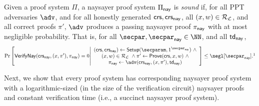 \begin{definition} Given a proof system $\Pi$, a naysayer proof system $\Pi_{\mathsf{nay}}$ is \emph{sound} if, for all PPT adversaries $\adv$, and for all honestly generated $\mathsf{crs}, \mathsf{crs}_{\mathsf{nay}}$, all $(x,w) \in \mathcal{R}_{\mathcal{L}}$, and all correct proofs $\pi'$, $\adv$ produces a passing naysayer proof $\pi_{\mathsf{nay}}$ with at most negligible probability. That is, for all $\secpar, \naysecpar \in \NN$, and all $\mathsf{td}_{\mathsf{nay}}$,
\begin{equation*}
    \Pr\left[
        \vrfynay(\crs_{\nay}, (x,\pi'), \pi_{\nay})=0 
        \middle| 
        \begin{array}{c}
            (\crs, \crs_\nay) \gets \setup(\secparam, \naysecparam)~\land\\
            (x,w) \in \Rel_\Lang~\land
            \pi' \gets \prove(\crs, x, w)~\land\\
            \pi_\nay \gets \adv(\crs_\nay, (x, \pi'), \td_\nay)
        \end{array}
    \right] \leq\negl[\naysecpar].\footnotemark
\end{equation*}
\end{definition}

Next, we show that every proof system has corresponding naysayer proof system with a logarithmic-sized (in the size of the verification circuit) naysayer proofs and constant verification time (i.e., a succinct naysayer proof system). %


